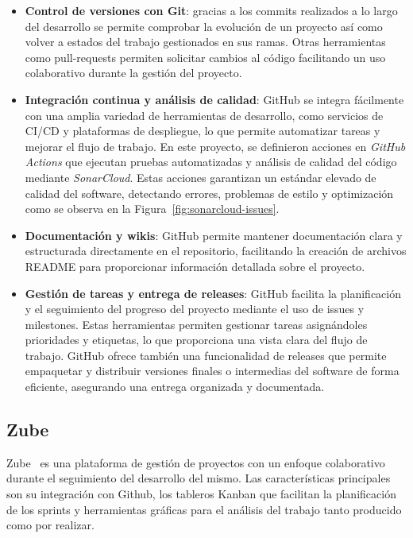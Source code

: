 	\begin{itemize}
		
		\item \textbf{Control de versiones con Git}: gracias a los commits realizados a lo largo del desarrollo se permite comprobar la evolución de un proyecto así como volver a estados del trabajo gestionados en sus ramas. Otras herramientas como pull-requests permiten solicitar cambios al código facilitando un uso colaborativo durante la gestión del proyecto.
		
		\item \textbf{Integración continua y análisis de calidad}: GitHub se integra fácilmente con una amplia variedad de herramientas de desarrollo, como servicios de CI/CD y plataformas de despliegue, lo que permite automatizar tareas y mejorar el flujo de trabajo. En este proyecto, se definieron acciones en \textit{GitHub Actions} que ejecutan pruebas automatizadas y análisis de calidad del código mediante \textit{SonarCloud}. Estas acciones garantizan un estándar elevado de calidad del software, detectando errores, problemas de estilo y optimización como se observa en la Figura~\ref{fig:sonarcloud-issues}. 
		
		\item \textbf{Documentación y wikis}: GitHub permite mantener documentación clara y estructurada directamente en el repositorio, facilitando la creación de archivos README para proporcionar información detallada sobre el proyecto.
		
		\item \textbf{Gestión de tareas y entrega de releases}: GitHub facilita la planificación y el seguimiento del progreso del proyecto mediante el uso de issues y milestones. Estas herramientas permiten gestionar tareas asignándoles prioridades y etiquetas, lo que proporciona una vista clara del flujo de trabajo. GitHub ofrece también una funcionalidad de releases que permite empaquetar y distribuir versiones finales o intermedias del software de forma eficiente, asegurando una entrega organizada y documentada.
	\end{itemize}
	
	\subsection{Zube}
	Zube~\cite{zube} es una plataforma de gestión de proyectos con un enfoque colaborativo durante el seguimiento del desarrollo del mismo. Las características principales son su integración con Github, los tableros Kanban que facilitan la planificación de los sprints y herramientas gráficas para el análisis del trabajo tanto producido como por realizar.
	

